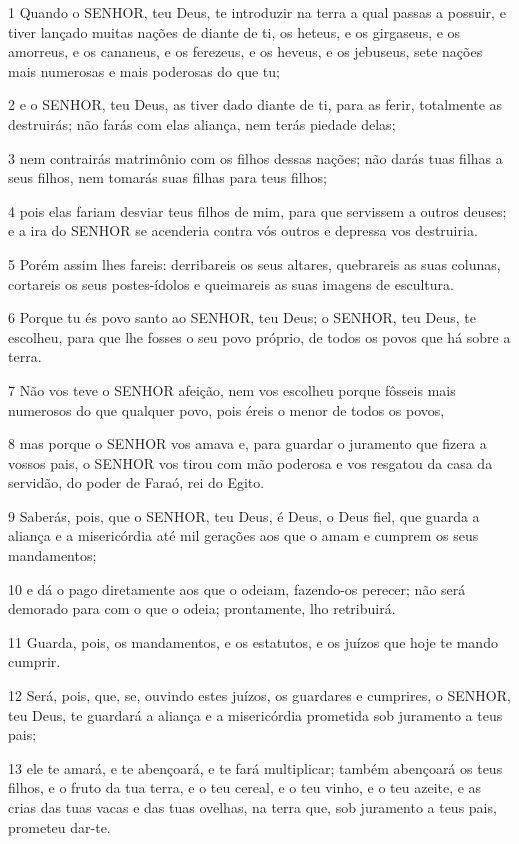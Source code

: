 \par 1 Quando o SENHOR, teu Deus, te introduzir na terra a qual passas a possuir, e tiver lançado muitas nações de diante de ti, os heteus, e os girgaseus, e os amorreus, e os cananeus, e os ferezeus, e os heveus, e os jebuseus, sete nações mais numerosas e mais poderosas do que tu;
\par 2 e o SENHOR, teu Deus, as tiver dado diante de ti, para as ferir, totalmente as destruirás; não farás com elas aliança, nem terás piedade delas;
\par 3 nem contrairás matrimônio com os filhos dessas nações; não darás tuas filhas a seus filhos, nem tomarás suas filhas para teus filhos;
\par 4 pois elas fariam desviar teus filhos de mim, para que servissem a outros deuses; e a ira do SENHOR se acenderia contra vós outros e depressa vos destruiria.
\par 5 Porém assim lhes fareis: derribareis os seus altares, quebrareis as suas colunas, cortareis os seus postes-ídolos e queimareis as suas imagens de escultura.
\par 6 Porque tu és povo santo ao SENHOR, teu Deus; o SENHOR, teu Deus, te escolheu, para que lhe fosses o seu povo próprio, de todos os povos que há sobre a terra.
\par 7 Não vos teve o SENHOR afeição, nem vos escolheu porque fôsseis mais numerosos do que qualquer povo, pois éreis o menor de todos os povos,
\par 8 mas porque o SENHOR vos amava e, para guardar o juramento que fizera a vossos pais, o SENHOR vos tirou com mão poderosa e vos resgatou da casa da servidão, do poder de Faraó, rei do Egito.
\par 9 Saberás, pois, que o SENHOR, teu Deus, é Deus, o Deus fiel, que guarda a aliança e a misericórdia até mil gerações aos que o amam e cumprem os seus mandamentos;
\par 10 e dá o pago diretamente aos que o odeiam, fazendo-os perecer; não será demorado para com o que o odeia; prontamente, lho retribuirá.
\par 11 Guarda, pois, os mandamentos, e os estatutos, e os juízos que hoje te mando cumprir.
\par 12 Será, pois, que, se, ouvindo estes juízos, os guardares e cumprires, o SENHOR, teu Deus, te guardará a aliança e a misericórdia prometida sob juramento a teus pais;
\par 13 ele te amará, e te abençoará, e te fará multiplicar; também abençoará os teus filhos, e o fruto da tua terra, e o teu cereal, e o teu vinho, e o teu azeite, e as crias das tuas vacas e das tuas ovelhas, na terra que, sob juramento a teus pais, prometeu dar-te.
